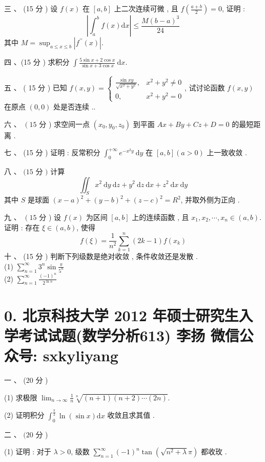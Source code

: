 \documentclass[10pt]{article}
\begin{document}
{ 三 、 (15  分 )  设  $f(x)$  在  $[a, b]$  上二次连续可微 ,  且  $f\left(\frac{a+b}{2}\right)=0$,  证明 :
$$
\left|\int_{a}^{b} f(x) \mathrm{d} x\right| \leq \frac{M(b-a)^{3}}{24}
$$
 其中  $M=\sup _{a \leq x \leq b}\left|f^{\prime \prime}(x)\right|$.

 四 、(15  分 )  求积分  $\int \frac{5 \sin x+2 \cos x}{\sin x+3 \cos x} \mathrm{~d} x$.

 五 、 ( 15  分 )  已知  $f(x, y)=\left\{\begin{array}{cc}\frac{\sin x y}{\sqrt{x^{2}+y^{2}}}, & x^{2}+y^{2} \neq 0 \\ 0, & x^{2}+y^{2}=0\end{array}\right.$,  试讨论函数  $f(x, y)$  在原点  $(0,0)$  处是否连续 ..

 六 、 $\left(15\right.$  分 )  求空间一点  $\left(x_{0}, y_{0}, z_{0}\right)$  到平面  $A x+B y+C z+D=0$  的最短距离 .

 七 、 (15  分 )  证明 :  反常积分  $\int_{0}^{+\infty} e^{-x^{2} y} \mathrm{~d} y$  在  $[a, b](a>0)$  上一致收敛 .

 八 、 $(15$  分  $)$  计算 
$$
\iint_{S} x^{2} \mathrm{~d} y \mathrm{~d} z+y^{2} \mathrm{~d} z \mathrm{~d} x+z^{2} \mathrm{~d} x \mathrm{~d} y
$$
 其中  $S$  是球面  $(x-a)^{2}+(y-b)^{2}+(z-c)^{2}=R^{2}$,  并取外侧为正向 .

 九 、 $\left(15\right.$  分 )  设  $f(x)$  为区间  $[a, b]$  上的连续函数 ,  且  $x_{1}, x_{2}, \cdots, x_{n} \in(a, b)$.  证明 :  存在  $\xi \in(a, b)$,  使得 
$$
f(\xi)=\frac{1}{n^{2}} \sum_{k=1}^{n}(2 k-1) f\left(x_{k}\right)
$$
 十 、 (15  分 )  判断下列级数是绝对收敛 ,  条件收敛还是发散 .\\
(1) $\sum_{n=1}^{\infty} 3^{n} \sin \frac{\pi}{5^{n}}$\\
(2) $\sum_{n=1}^{\infty} \frac{(-1)^{n}}{2^{\ln n}}$

\section{0. 北京科技大学 2012 年硕士研究生入学考试试题(数学分析613) 
 李扬 
 微信公众号: sxkyliyang}
 一 、 (20  分 )

(1)  求极限  $\lim _{n \rightarrow \infty} \frac{1}{n} \sqrt[n]{(n+1)(n+2) \cdots(2 n)}$.

(2)  证明积分  $\int_{0}^{\frac{\pi}{2}} \ln (\sin x) \mathrm{d} x$  收敛且求其值 .

 二 、 $(20$  分 )

(1)  证明 :  对于  $\lambda>0$,  级数  $\sum_{n=1}^{\infty}(-1)^{n} \tan \left(\sqrt{n^{2}+\lambda} \pi\right)$  都收玫 .

}
\end{document}

